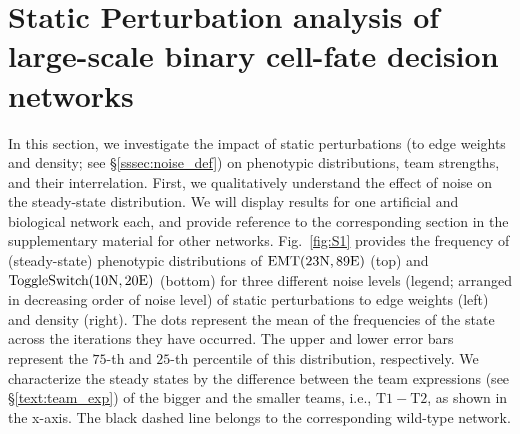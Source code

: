 \section{Static Perturbation analysis of large-scale binary cell-fate decision networks} \label{ssec:stat_pert}
In this section, we investigate the impact of static perturbations (to edge weights and density; see \S\ref{sssec:noise_def}) on phenotypic distributions, team strengths, and their interrelation. First, we qualitatively understand the effect of noise on the steady-state distribution. We will display results for one artificial and biological network each, and provide reference to the corresponding section in the supplementary material for other networks. Fig.~\ref{fig:S1} provides the frequency of (steady-state) phenotypic distributions of $\mathrm{EMT (23N,89E)}$ (top) and $\mathrm{Toggle Switch (10N,20E)}$ (bottom) for three different noise levels (legend; arranged in decreasing order of noise level) of static perturbations to edge weights (left) and density (right). The dots represent the mean of the frequencies of the state across the iterations they have occurred. The upper and lower error bars represent the $75$-th and $25$-th percentile of this distribution, respectively. We characterize the steady states by the difference between the team expressions (see \S\ref{text:team_exp}) of the bigger and the smaller teams, i.e., $\mathrm{T1-T2}$, as shown in the x-axis. The black dashed line belongs to the corresponding wild-type network. 

